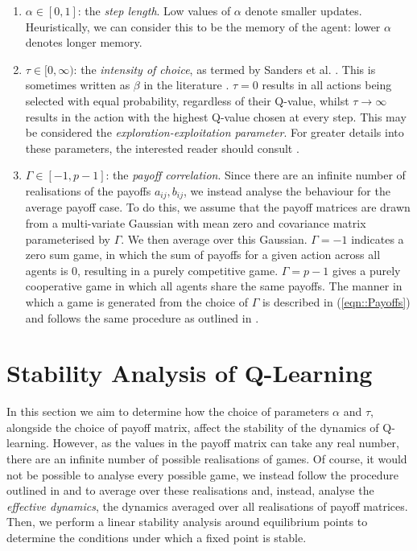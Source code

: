 \documentclass[sigconf]{aamas}
\begin{document}
\begin{enumerate}
    \item $\alpha \in [0, 1]$: the \textit{step length}. Low values of $\alpha$ denote smaller
    updates. Heuristically, we can consider this to be the memory of the agent: lower $\alpha$
    denotes longer memory.
    \item $\tau \in [0, \infty)$: the \textit{intensity of choice}, as termed by Sanders et al. 
    \cite{Sanders2018}. This is sometimes written as $\beta$ in the literature \cite{Sutton2018}.
    $\tau = 0$ results in all actions being selected with equal probability, regardless of their
    Q-value, whilst $\tau \rightarrow \infty$ results in the action with the highest Q-value chosen
    at every step. This may be considered the \textit{exploration-exploitation parameter}. For greater
    details into these parameters, the interested reader should consult \cite{Sutton2018}.
    \item $\Gamma \in [-1, p-1]$: the \textit{payoff correlation}. Since there are an infinite number of realisations of the payoffs $a_{ij}, b_{ij}$, we instead analyse the behaviour for the average payoff case. To do this, we assume that the payoff matrices are drawn from a multi-variate Gaussian with mean zero and
    covariance matrix parameterised by $\Gamma$. We then average over this Gaussian. $\Gamma = -1$ indicates a zero
    sum game, in which the sum of payoffs for a given action across all agents is 0, resulting in a
    purely competitive game. $\Gamma = p-1$ gives a purely cooperative game in which all agents
    share the same payoffs. The manner in which a game is generated from the choice of $\Gamma$ is
    described in (\ref{eqn::Payoffs}) and follows the same procedure as outlined in \cite{Sanders2018}.
\end{enumerate}


\section{Stability Analysis of Q-Learning} \label{sec::Theory}

In this section we aim to determine how the choice of parameters $\alpha$ and $\tau$, alongside the choice of payoff matrix, affect the stability of the dynamics of Q-learning. However, as the values in the payoff matrix can take any real number, there are an infinite number of possible realisations of games. Of course, it would not be possible to analyse every possible game, we instead follow the procedure outlined in \cite{Coolen2005} and \cite{Galla2013} to average over these realisations and, instead, analyse the \textit{effective dynamics}, the dynamics averaged over all realisations of payoff matrices. Then, we perform a linear stability analysis around equilibrium points to determine the conditions under which a fixed point is stable.
\end{document}
